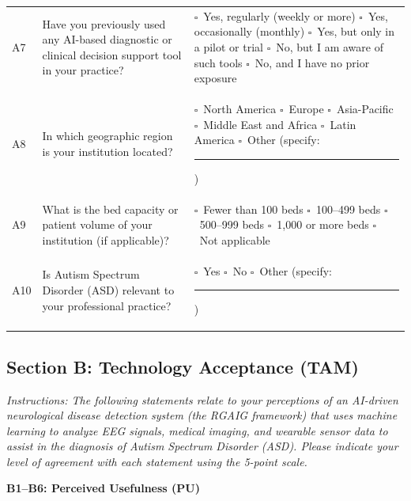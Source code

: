 {\begin{xltabular}{\textwidth}{@{} p{1.0cm} p{6.0cm} p{7.3cm} @{}}
\addlinespace
A7 & Have you previously used any AI-based diagnostic or clinical decision support tool in your practice? & $\square$~Yes, regularly (weekly or more) \quad $\square$~Yes, occasionally (monthly) \quad $\square$~Yes, but only in a pilot or trial \quad $\square$~No, but I am aware of such tools \quad $\square$~No, and I have no prior exposure \\
\addlinespace
A8 & In which geographic region is your institution located? & $\square$~North America \quad $\square$~Europe \quad $\square$~Asia-Pacific \quad $\square$~Middle East and Africa \quad $\square$~Latin America \quad $\square$~Other (specify: \rule{3cm}{0.4pt}) \\
\addlinespace
A9 & What is the bed capacity or patient volume of your institution (if applicable)? & $\square$~Fewer than 100 beds \quad $\square$~100--499 beds \quad $\square$~500--999 beds \quad $\square$~1,000 or more beds \quad $\square$~Not applicable \\
\addlinespace
A10 & Is Autism Spectrum Disorder (ASD) relevant to your professional practice? & $\square$~Yes \quad $\square$~No \quad $\square$~Other (specify: \rule{3cm}{0.4pt}) \\
\end{xltabular}}

\subsection{Section B: Technology Acceptance (TAM)}
\label{subsec:survey_tam}

\noindent\textit{Instructions: The following statements relate to your perceptions of an AI-driven neurological disease detection system (the RGAIG framework) that uses machine learning to analyze EEG signals, medical imaging, and wearable sensor data to assist in the diagnosis of Autism Spectrum Disorder (ASD). Please indicate your level of agreement with each statement using the 5-point scale.}

\noindent\textbf{B1--B6: Perceived Usefulness (PU)}

